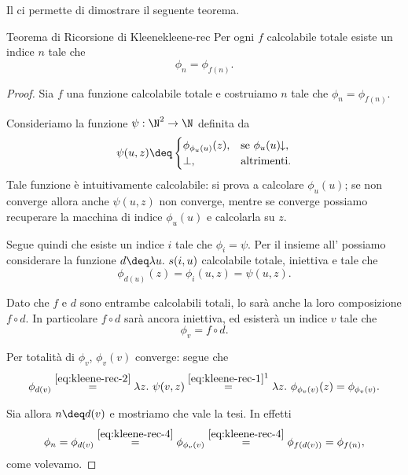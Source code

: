 Il  ci permette di dimostrare il seguente teorema.

\begin{theorem}
    {Teorema di Ricorsione di Kleene}{kleene-rec}
    Per ogni $f$ calcolabile totale esiste un indice $n$ tale che \[
        \phi_n = \phi_{f(n)}.
    \]
\end{theorem}
\begin{proof}
    Sia $f$ una funzione calcolabile totale e costruiamo $n$ tale che $\phi_n = \phi_{f(n)}$.

    Consideriamo la funzione $\psi : \N^2 \to \N$ definita da \begin{equation}\label{eq:kleene-rec-1}
        \psi(u, z) \deq \begin{cases}
            \phi_{\phi_u(u)}(z), &\text{se } \phi_{u}(u)\conv,\\
            \bot, &\text{altrimenti.}
        \end{cases}
    \end{equation} Tale funzione è intuitivamente calcolabile: si prova a calcolare $\phi_u(u)$; se non converge allora anche $\psi(u, z)$ non converge, mentre se converge possiamo recuperare la macchina di indice $\phi_u(u)$ e calcolarla su $z$.
    
    Segue quindi che esiste un indice $i$ tale che $\phi_i = \psi$. Per il  insieme all' possiamo considerare la funzione $d \deq \lam{u}{s(i, u)}$ calcolabile totale, iniettiva e tale che \begin{equation}\label{eq:kleene-rec-2}
        \phi_{d(u)}(z) = \phi_i(u, z) = \psi(u, z).
    \end{equation}

    Dato che $f$ e $d$ sono entrambe calcolabili totali, lo sarà anche la loro composizione $f \circ d$. In particolare $f \circ d$ sarà ancora iniettiva, ed esisterà un indice $v$ tale che \begin{equation*}\label{eq:kleene-rec-3}
        \phi_v = f \circ d.
    \end{equation*}

    Per totalità di $\phi_v$, $\phi_v(v)$ converge: segue che \begin{equation}\label{eq:kleene-rec-4}
        \phi_{d(v)} 
            \stackrel{\eqref{eq:kleene-rec-2}}{=} \lam{z}{\psi(v,z)} 
            \stackrel{\eqref{eq:kleene-rec-1}\footnotemark}{=} \lam{z}{\phi_{\phi_v(v)}(z)}
            = \phi_{\phi_v(v)}.
    \end{equation}
    
    Sia allora $n \deq d(v)$ e mostriamo che vale la tesi. In effetti \[
        \phi_n 
            = \phi_{d(v)} 
            \stackrel{\eqref{eq:kleene-rec-4}}{=} \phi_{\phi_v(v)}
            \stackrel{\eqref{eq:kleene-rec-4}}{=} \phi_{f(d(v))}
            = \phi_{f(n)},
    \] come volevamo.
\end{proof}